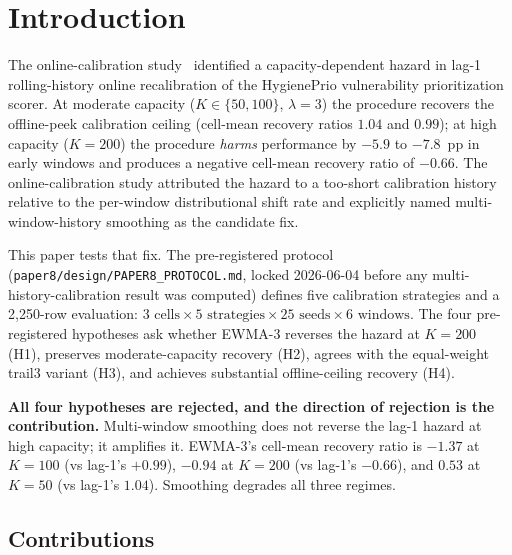 \section{Introduction}

The online-calibration study~\cite{paper7online} identified a capacity-dependent hazard
in lag-1 rolling-history online recalibration of the HygienePrio
vulnerability prioritization scorer. At moderate capacity
($K \in \{50, 100\}$, $\lambda = 3$) the procedure recovers the
offline-peek calibration ceiling (cell-mean recovery ratios
$1.04$ and $0.99$); at high capacity ($K = 200$) the procedure
\textit{harms} performance by $-5.9$ to $-7.8$~pp in early windows
and produces a negative cell-mean recovery ratio of $-0.66$. The online-calibration study
attributed the hazard to a too-short calibration history relative to
the per-window distributional shift rate and explicitly named
multi-window-history smoothing as the candidate fix.

This paper tests that fix. The pre-registered protocol
(\texttt{paper8/design/PAPER8\_PROTOCOL.md}, locked 2026-06-04 before
any multi-history-calibration result was computed) defines five
calibration strategies and a 2{,}250-row evaluation:
$3 \text{ cells} \times 5 \text{ strategies} \times 25 \text{ seeds}
\times 6 \text{ windows}$. The four pre-registered hypotheses
ask whether EWMA-3 reverses the hazard at $K = 200$ (H1), preserves
moderate-capacity recovery (H2), agrees with the equal-weight
trail3 variant (H3), and achieves substantial offline-ceiling
recovery (H4).

\textbf{All four hypotheses are rejected, and the direction of
rejection is the contribution.} Multi-window smoothing does not
reverse the lag-1 hazard at high capacity; it amplifies it. EWMA-3's
cell-mean recovery ratio is $-1.37$ at $K = 100$ (vs lag-1's $+0.99$),
$-0.94$ at $K = 200$ (vs lag-1's $-0.66$), and $0.53$ at $K = 50$
(vs lag-1's $1.04$). Smoothing degrades all three regimes.

\subsection{Contributions}

